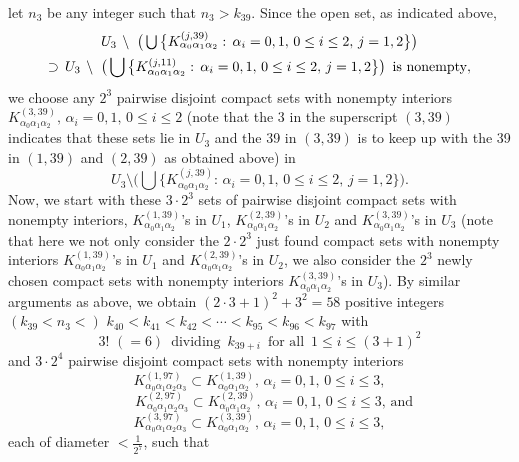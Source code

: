 \documentclass[12pt]{article}
\newcommand{\al}{\alpha}
\begin{document}
let $n_3$ be any integer such that $n_3 > k_{39}$.  Since the open set, as indicated above, 
\begin{multline*}
$$
U_3 \, \setminus \ \big( \bigcup \big\{ K_{\al_0\al_1\al_2}^{(j,39)}: \, \al_i = 0, 1, \, 0 \le i \le 2, \, j = 1, 2 \big\} \big) \\
\supset \, U_3 \, \setminus \ \big( \bigcup \big\{ K_{\al_0\al_1\al_2}^{(j,11)}: \, \al_i = 0, 1, \, 0 \le i \le 2, \, j = 1, 2 \big\} \big) \,\,\, \text{is nonempty},
$$
\end{multline*}
we choose any $2^3$ pairwise disjoint compact sets with nonempty interiors $K_{\al_0\al_1\al_2}^{(3,39)}, \, \al_i = 0, 1, \, 0 \le i \le 2$ \big(note that the 3 in the superscript $(3, 39)$ indicates that these sets lie in $U_3$ and the 39 in $(3, 39)$ is to keep up with the 39 in $(1, 39)$ and $(2, 39)$ as obtained above\big) in 
$$
U_3 \setminus \bigg( \bigcup \big\{ K_{\al_0\al_1\al_2}^{(j,39)}: \, \al_i = 0, 1, \, 0 \le i \le 2, \, j = 1, 2 \big\} \bigg).
$$ 
\indent Now, we start with these $3 \cdot 2^3$ sets of pairwise disjoint compact sets with nonempty interiors, $K_{\al_0\al_1\al_2}^{(1,39)}$'s in $U_1$, $K_{\al_0\al_1\al_2}^{(2,39)}$'s in $U_2$ and $K_{\al_0\al_1\al_2}^{(3,39)}$'s in $U_3$ \big(note that here we not only consider the $2 \cdot 2^3$ just found compact sets with nonempty interiors $K_{\al_0\al_1\al_2}^{(1,39)}$'s in $U_1$ and $K_{\al_0\al_1\al_2}^{(2,39)}$'s in $U_2$, we also consider the $2^3$ newly chosen compact sets with nonempty interiors $K_{\al_0\al_1\al_2}^{(3,39)}$'s in $U_3$\big).  By similar arguments as above, we obtain $(2 \cdot 3+1)^2 +3^2= 58$ positive integers $(k_{39} < n_3 <)$ $k_{40} < k_{41} < k_{42} < \cdots < k_{95} < k_{96} < k_{97}$ with 
$$
3! \,\, (= 6) \,\,\, \text{dividing} \,\,\, k_{39+i} \,\,\, \text{for all} \,\,\, 1 \le i \le (3+1)^2 
$$
and $3 \cdot 2^4$ pairwise disjoint compact sets with nonempty interiors 
$$
K_{\al_0\al_1\al_2\al_3}^{(1,97)} \subset K_{\al_0\al_1\al_2}^{(1,39)}, \, \al_i = 0, 1, \, 0 \le i \le 3,
$$
$$
\qquad K_{\al_0\al_1\al_2\al_3}^{(2,97)} \subset K_{\al_0\al_1\al_2}^{(2,39)}, \, \al_i = 0, 1, \, 0 \le i \le 3, \, \text{and}
$$
$$
K_{\al_0\al_1\al_2\al_3}^{(3,97)} \subset K_{\al_0\al_1\al_2}^{(3,39)}, \, \al_i = 0, 1, \, 0 \le i \le 3,
$$
each of diameter $< \frac 1{2^7}$, such that 
\end{document}
